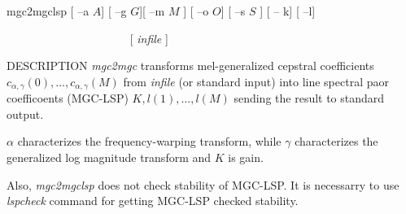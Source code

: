 \begin{synopsis}
\item [mgc2mgclsp] [ --a $A$] [ --g $G$][ --m $M$ ] [ --o $O$] [ --s
  $S$ ] [ -- k] [ --l]
\item[\ ~~~~~~~~~~~~~~~~~~~~] [ {\em infile} ] 

\end{synopsis}

\begin{qsection}{DESCRIPTION}
{\em mgc2mgc} transforms mel-generalized cepstral coefficients
$c_{\alpha,\gamma}(0), \dots, c_{\alpha,\gamma}(M)$
from {\em infile} (or standard input) 
into line spectral paor coefficoents (MGC-LSP) $K, l(1), \dots, l(M)$
sending the result to standard output.

$\alpha$ characterizes the frequency-warping transform,
while $\gamma$ characterizes the generalized log magnitude transform
and $K$ is gain.

Also, {\em mgc2mgclsp} does not
check stability of MGC-LSP. It is necessarry to use {\em lspcheck} command
for getting MGC-LSP checked stability.


\end{qsection}

\begin{options}

\end{options}

